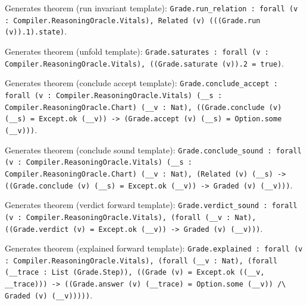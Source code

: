 \documentclass[11pt]{article}
\begin{document}
\noindent Generates theorem (run invariant template): \texttt{Grade.run\_relation : forall (v : Compiler.ReasoningOracle.Vitals), Related (v) (((Grade.run (v)).1).state)}.\par
\noindent Generates theorem (unfold template): \texttt{Grade.saturates : forall (v : Compiler.ReasoningOracle.Vitals), ((Grade.saturate (v)).2 = true)}.\par
\noindent Generates theorem (conclude accept template): \texttt{Grade.conclude\_accept : forall (v : Compiler.ReasoningOracle.Vitals) (\_\_s : Compiler.ReasoningOracle.Chart) (\_\_v : Nat), ((Grade.conclude (v) (\_\_s) = Except.ok (\_\_v)) -> (Grade.accept (v) (\_\_s) = Option.some (\_\_v)))}.\par
\noindent Generates theorem (conclude sound template): \texttt{Grade.conclude\_sound : forall (v : Compiler.ReasoningOracle.Vitals) (\_\_s : Compiler.ReasoningOracle.Chart) (\_\_v : Nat), (Related (v) (\_\_s) -> ((Grade.conclude (v) (\_\_s) = Except.ok (\_\_v)) -> Graded (v) (\_\_v)))}.\par
\noindent Generates theorem (verdict forward template): \texttt{Grade.verdict\_sound : forall (v : Compiler.ReasoningOracle.Vitals), (forall (\_\_v : Nat), ((Grade.verdict (v) = Except.ok (\_\_v)) -> Graded (v) (\_\_v)))}.\par
\noindent Generates theorem (explained forward template): \texttt{Grade.explained : forall (v : Compiler.ReasoningOracle.Vitals), (forall (\_\_v : Nat), (forall (\_\_trace : List (Grade.Step)), ((Grade (v) = Except.ok ((\_\_v, \_\_trace))) -> ((Grade.answer (v) (\_\_trace) = Option.some (\_\_v)) /\textbackslash{} Graded (v) (\_\_v)))))}.\par
\end{document}
